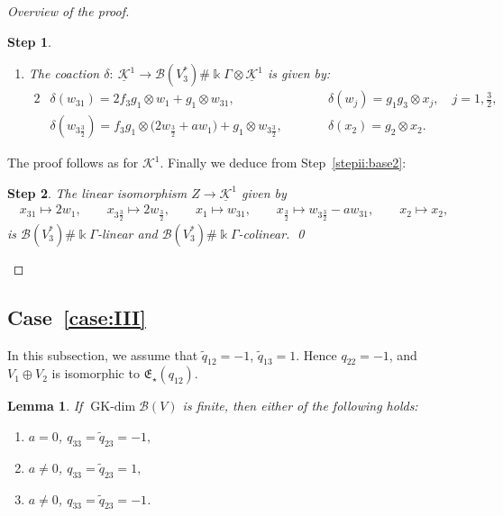 \documentclass[pdftex]{sigma}
\numberwithin{equation}{section}
\newtheorem{Lemma}[Theorem]{Lemma}
\newtheorem{stepii}{Step}
\newcommand{\GK}{\operatorname{GK-dim}}
\newcommand{\toba}{\mathscr B}
\newcommand{\K}{{\mathcal{K}}}
\newcommand{\Ku}{\underline{\mathcal K}}
\newcommand{\eny}{\mathfrak{E}}
\newcommand{\tresdos}{\frac{3}{2}}
\begin{document}
\begin{proof}[Overview of the proof]
\begin{stepii}
\begin{enumerate}[label=$(\roman*)$]
\item The coaction $\delta\colon\ \Ku^1\to \toba(V_3^*)\#\Bbbk\Gamma\otimes \Ku^1$ is given by:
\begin{alignat*}{2}
&\delta(w_{31}) = 2f_3g_1 \otimes w_{1}+g_1\otimes w_{31},
&&\delta(w_{j})=g_1g_3\otimes x_{j}, \quad j=1,\tfrac{3}{2},
\\
&\delta(w_{3\tresdos}) = f_3g_1 \otimes \big(2w_{\tresdos}+aw_{1}\big)+g_1\otimes w_{3\tresdos}, \qquad
&&\delta(x_2) = g_2\otimes x_2.
\end{alignat*}
\end{enumerate}
\end{stepii}
The proof follows as for $\K^1$. Finally we deduce from Step~\ref{stepii:base2}:

\begin{stepii}\label{stepii:isomorphism}
The linear isomorphism $Z\to\Ku^1$ given by
\begin{align*}
x_{31} \mapsto 2w_1,\qquad
x_{3\tresdos} \mapsto 2w_{\tresdos},\qquad
x_{1} \mapsto w_{31},\qquad
x_{\tresdos} \mapsto w_{3\tresdos}-aw_{31},\qquad
x_{2} \mapsto x_2,
\end{align*}
is $\toba(V_3^*)\#\Bbbk\Gamma$-linear and $\toba(V_3^*)\#\Bbbk\Gamma$-colinear. \hfill \qed
\end{stepii}
\renewcommand{\qed}{}
\end{proof}

\subsection[Case~(III)]{Case~\ref{case:III}}
In this subsection, we assume that $\widetilde{q}_{12}=-1$, $\widetilde{q}_{13}=1$.
Hence $q_{22}=-1$, and $V_1\oplus V_2$ is isomorphic to $\eny_{\star}(q_{12})$.

\begin{Lemma}\label{lemma:caseIII-general}
If $\GK \toba(V)$ is finite, then either of the following holds:{\samepage
\begin{enumerate}[label=$(\Alph*)$]
\item\label{item:caseIII-A} $a = 0$, $q_{33} =\widetilde{q}_{23}= -1,$

\item\label{item:caseIII-B} $a \ne 0$, $q_{33} =\widetilde{q}_{23}= 1,$

\item\label{item:caseIII-C} $a \ne 0$, $q_{33} =\widetilde{q}_{23}= -1$.
\end{enumerate}}
\end{Lemma}
\end{document}
